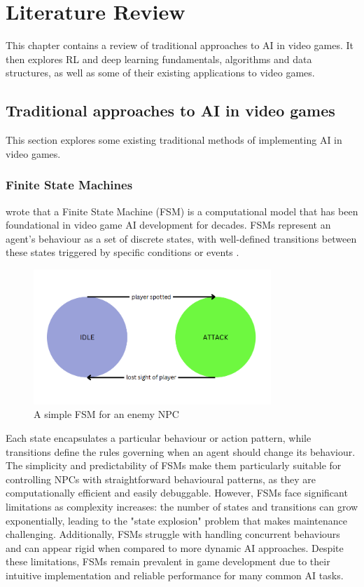 \chapter{Literature Review}

This chapter contains a review of traditional approaches to AI in video games.
It then explores RL and deep learning fundamentals, algorithms and data structures, as well as some of their existing applications to video games.

\section{Traditional approaches to AI in video games}

This section explores some existing traditional methods of implementing AI in video games.

\subsection{Finite State Machines}

\cite{gamedevelopertips_fsm} wrote that a Finite State Machine (FSM) is a computational model that has been foundational in video game AI development for decades. 
FSMs represent an agent's behaviour as a set of discrete states, with well-defined transitions between these states triggered by specific conditions or events \cite{spiceworks_fsm}. 

\begin{figure}[H]
    \centering
    \includegraphics[width=0.8\textwidth]{figures/fsm_example.png}
    \caption{A simple FSM for an enemy NPC}
    \label{fig:fsm}
\end{figure}

Each state encapsulates a particular behaviour or action pattern, while transitions define the rules governing when an agent should change its behaviour. 
The simplicity and predictability of FSMs make them particularly suitable for controlling NPCs with straightforward behavioural patterns, as they are computationally efficient and easily debuggable.
However, FSMs face significant limitations as complexity increases: the number of states and transitions can grow exponentially, leading to the "state explosion" problem that makes maintenance challenging.
Additionally, FSMs struggle with handling concurrent behaviours and can appear rigid when compared to more dynamic AI approaches. 
Despite these limitations, FSMs remain prevalent in game development due to their intuitive implementation and reliable performance for many common AI tasks.

